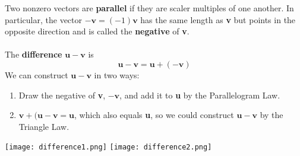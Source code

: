   Two nonzero vectors are \textbf{parallel} if they are scaler multiples of one another. In particular, the vector $-\mathbf{v} = (-1)\mathbf{v}$ has the same length as \textbf{v} but points in the opposite direction and is called the \textbf{negative} of \textbf{v}.\\~\\
  The \textbf{difference} $\mathbf{u}-\mathbf{v}$ is $$ \mathbf{u}-\mathbf{v} = \mathbf{u}+ (-\mathbf{v})$$
  We can construct $\mathbf{u}-\mathbf{v}$ in two ways:
  \begin{enumerate}
    \item Draw the negative of \textbf{v}, $-\mathbf{v}$, and add it to \textbf{u} by the Parallelogram Law.
    \item $\mathbf{v}+(\mathbf{u}-\mathbf{v}=\mathbf{u}$, which also equals \textbf{u}, so we could construct $\mathbf{u}-\mathbf{v}$ by the Triangle Law.
  \end{enumerate}
  \begin{center}
    \texttt{[image: difference1.png]}
    \hspace{45pt}
    \texttt{[image: difference2.png]}
  \end{center}
